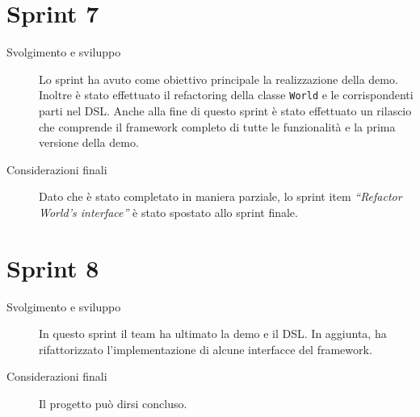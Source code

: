 \section{Sprint 7}\label{sec:sprint-7}
\begin{description}
    \item[Svolgimento e sviluppo] Lo sprint ha avuto come obiettivo principale la realizzazione della demo.
    Inoltre è stato effettuato il refactoring della classe \texttt{World} e le corrispondenti parti nel DSL\@.
    Anche alla fine di questo sprint è stato effettuato un rilascio che comprende il framework completo di tutte le
    funzionalità e la prima versione della demo.
    \item[Considerazioni finali] Dato che è stato completato in maniera parziale, lo sprint item
    \textit{``Refactor World's interface''} è stato spostato allo sprint finale.
\end{description}
\section{Sprint 8}\label{sec:sprint-8}
\begin{description}
    \item[Svolgimento e sviluppo] In questo sprint il team ha ultimato la demo e il DSL. In aggiunta, ha rifattorizzato
    l'implementazione di alcune interfacce del framework.
    \item[Considerazioni finali] Il progetto può dirsi concluso.
\end{description}
